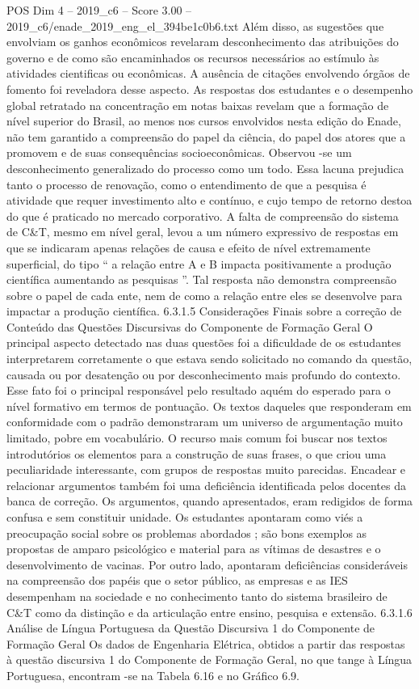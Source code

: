 \begin{textsample}{POS Dim 4 – 2019\_c6 – Score 3.00 – 2019\_c6/enade\_2019\_eng\_el\_394be1c0b6.txt}
Além disso, as sugestões que envolviam os ganhos econômicos revelaram desconhecimento das atribuições do governo e de como são encaminhados os recursos necessários ao estímulo às atividades cientificas ou econômicas.
A ausência de citações envolvendo órgãos de fomento foi reveladora desse aspecto.
As respostas dos estudantes e o desempenho global retratado na concentração em notas baixas revelam que a formação de nível superior do Brasil, ao menos nos cursos envolvidos nesta edição do Enade, não tem garantido a compreensão do papel da ciência, do papel dos atores que a promovem e de suas consequências socioeconômicas.
Observou -se um desconhecimento generalizado do processo como um todo.
Essa lacuna prejudica tanto o processo de renovação, como o entendimento de que a pesquisa é atividade que requer investimento alto e contínuo, e cujo tempo de retorno destoa do que é praticado no mercado corporativo.
A falta de compreensão do sistema de C\&T, mesmo em nível geral, levou a um número expressivo de respostas em que se indicaram apenas relações de causa e efeito de nível extremamente superficial, do tipo “ a relação entre A e B impacta positivamente a produção científica aumentando as pesquisas ”.
Tal resposta não demonstra compreensão sobre o papel de cada ente, nem de como a relação entre eles se desenvolve para impactar a produção científica. 6.3.1.5 Considerações Finais sobre a correção de Conteúdo das Questões Discursivas do Componente de Formação Geral O principal aspecto detectado nas duas questões foi a dificuldade de os estudantes interpretarem corretamente o que estava sendo solicitado no comando da questão, causada ou por desatenção ou por desconhecimento mais profundo do contexto.
Esse fato foi o principal responsável pelo resultado aquém do esperado para o nível formativo em termos de pontuação.
Os textos daqueles que responderam em conformidade com o padrão demonstraram um universo de argumentação muito limitado, pobre em vocabulário.
O recurso mais comum foi buscar nos textos introdutórios os elementos para a construção de suas frases, o que criou uma peculiaridade interessante, com grupos de respostas muito parecidas.
Encadear e relacionar argumentos também foi uma deficiência identificada pelos docentes da banca de correção.
Os argumentos, quando apresentados, eram redigidos de forma confusa e sem constituir unidade.
Os estudantes apontaram como viés a preocupação social sobre os problemas abordados ; são bons exemplos as propostas de amparo psicológico e material para as vítimas de desastres e o desenvolvimento de vacinas.
Por outro lado, apontaram deficiências consideráveis na compreensão dos papéis que o setor público, as empresas e as IES desempenham na sociedade e no conhecimento tanto do sistema brasileiro de C\&T como da distinção e da articulação entre ensino, pesquisa e extensão. 6.3.1.6 Análise de Língua Portuguesa da Questão Discursiva 1 do Componente de Formação Geral Os dados de Engenharia Elétrica, obtidos a partir das respostas à questão discursiva 1 do Componente de Formação Geral, no que tange à Língua Portuguesa, encontram -se na Tabela 6.16 e no Gráfico 6.9.

\end{textsample}
